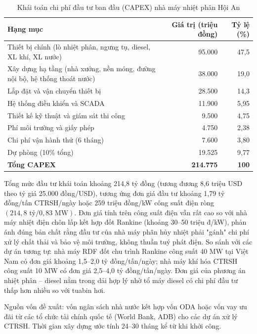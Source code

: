 \documentclass[../main.tex]{subfiles}
\begin{document}
\begin{table}[H]
\caption{Khái toán chi phí đầu tư ban đầu (CAPEX) nhà máy nhiệt phân Hội An}
\label{tab:khai-toan-capex}
\centering
\begin{tabular}{p{6.5cm} r r}
\toprule
\textbf{Hạng mục} & \textbf{Giá trị (triệu đồng)} & \textbf{Tỷ lệ (\%)} \\
\midrule
Thiết bị chính (lò nhiệt phân, ngưng tụ, diesel, XL khí, XL nước) & 95.000 & 47,5 \\
Xây dựng hạ tầng (nhà xưởng, nền móng, đường nội bộ, hệ thống thoát nước) & 38.000 & 19,0 \\
Lắp đặt và vận chuyển thiết bị & 28.500 & 14,3 \\
Hệ thống điều khiển và SCADA & 11.900 & 5,95 \\
Thiết kế kỹ thuật và giám sát thi công & 9.500 & 4,75 \\
Phí môi trường và giấy phép & 4.750 & 2,38 \\
Chi phí vận hành thử (6 tháng) & 7.600 & 3,80 \\
Dự phòng (10\% tổng) & 19.525 & 9,77 \\
\midrule
\textbf{Tổng CAPEX} & \textbf{214.775} & \textbf{100} \\
\bottomrule
\end{tabular}
\end{table}

Tổng mức đầu tư khái toán khoảng 214,8 tỷ đồng (tương đương 8,6 triệu USD theo tỷ giá 25.000 đồng/USD), tương ứng đơn giá đầu tư khoảng 1,79 tỷ đồng/tấn CTRSH/ngày hoặc 259 triệu đồng/kW công suất điện ròng $(214{,}8 \text{ tỷ} / 0{,}83 \text{ MW})$. Đơn giá tính trên công suất điện vẫn rất cao so với nhà máy nhiệt điện chôn lấp kết hợp đốt Rankine (khoảng 30--50 triệu đ/kW), phản ánh đúng bản chất rằng đầu tư của nhà máy phân hủy nhiệt phải "gánh" chi phí xử lý chất thải và bảo vệ môi trường, không thuần tuý phát điện. So sánh với các dự án tương tự: nhà máy RDF đốt chu trình Rankine công suất 40 MW tại Việt Nam có đơn giá khoảng 1,5--2,0 tỷ đồng/tấn/ngày; nhà máy khí hóa CTRSH công suất 10 MW có đơn giá 2,5--4,0 tỷ đồng/tấn/ngày. Đơn giá của phương án nhiệt phân -- diesel nằm trong dải hợp lý nhờ tổ máy diesel có chi phí đầu tư thấp hơn nhiều so với tuabin hơi.

Nguồn vốn đề xuất: vốn ngân sách nhà nước kết hợp vốn ODA hoặc vốn vay ưu đãi từ các tổ chức tài chính quốc tế (World Bank, ADB) cho các dự án xử lý CTRSH. Thời gian xây dựng ước tính 24--30 tháng kể từ khi khởi công.
\end{document}
